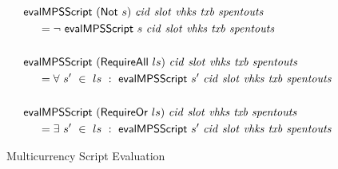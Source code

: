 \begin{figure*}[htb]
\begin{align*}
    &\mathsf{evalMPSScript}~(\mathsf{Not}~s)~\mathit{cid}~\mathit{slot}~\mathit{vhks}
    ~\mathit{txb}~\mathit{spentouts}
   \\
    &~~~~ = \neg ~\mathsf{evalMPSScript}~s~\mathit{cid}~\mathit{slot}~\mathit{vhks}
    ~\mathit{txb}~\mathit{spentouts}\\~\\
    &\mathsf{evalMPSScript}~(\mathsf{RequireAll}~ls)~\mathit{cid}~\mathit{slot}~\mathit{vhks}
    ~\mathit{txb}~\mathit{spentouts}
   \\
    &~~~~ = \forall ~s'~ \in~ ls~:~\mathsf{evalMPSScript}~s'~\mathit{cid}~\mathit{slot}~\mathit{vhks}
    ~\mathit{txb}~\mathit{spentouts}\\~\\
    &\mathsf{evalMPSScript}~(\mathsf{RequireOr}~ls)~\mathit{cid}~\mathit{slot}~\mathit{vhks}
    ~\mathit{txb}~\mathit{spentouts}
   \\
    &~~~~ = \exists ~s'~ \in~ ls~:~\mathsf{evalMPSScript}~s'~\mathit{cid}~\mathit{slot}~\mathit{vhks}
    ~\mathit{txb}~\mathit{spentouts}\\
  \end{align*}
  \caption{Multicurrency Script Evaluation}
  \label{fig:defs:tx-mc-eval}
\end{figure*}

